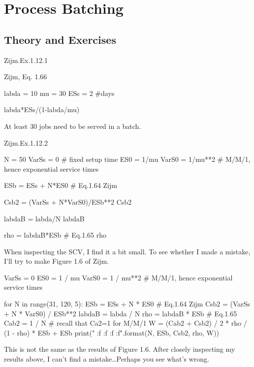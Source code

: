 \section{Process Batching}
\label{sec:process-batching}


\subsection*{Theory and Exercises}



\begin{exercise}
Zijm.Ex.1.12.1
 \begin{solution}
Zijm, Eq. 1.66

\begin{pyconsole}
labda = 10
mu = 30
ESs = 2 #days

labda*ESs/(1-labda/mu)
\end{pyconsole}

At least 30 jobs need to be served in a batch.
\end{solution}
\end{exercise}

\begin{exercise}
Zijm.Ex.1.12.2
 \begin{solution}

\begin{pyconsole}
  
N = 50
VarSs = 0 # fixed setup time
ES0 = 1/mu
VarS0 = 1/mu**2 # M/M/1, hence exponential service times

ESb = ESs + N*ES0 # Eq.1.64 Zijm

Csb2 = (VarSs + N*VarS0)/ESb**2 
Csb2

labdaB = labda/N
labdaB


rho = labdaB*ESb # Eq.1.65
rho 
\end{pyconsole}

When inspecting the SCV, I find it a bit small. To see whether I made a mistake, I'll try to make Figure 1.6 of Zijm.

\begin{pyconsole}
  
VarSs = 0
ES0 = 1 / mu
VarS0 = 1 / mu**2  # M/M/1, hence exponential service times

for N in range(31, 120, 5):
    ESb = ESs + N * ES0  # Eq.1.64 Zijm
    Csb2 = (VarSs + N * VarS0) / ESb**2
    labdaB = labda / N
    rho = labdaB * ESb  # Eq.1.65
    Cab2 = 1 / N  # recall that Ca2=1 for M/M/1
    W = (Cab2 + Csb2) / 2 * rho / (1 - rho) * ESb + ESb
    print("{} {:f} {:f} {:f} {:f}".format(N, ESb, Csb2, rho, W))

\end{pyconsole}

This is not the same as the results of Figure 1.6. After closely
inspecting my results above, I can't find a mistake\ldots Perhaps you see what's wrong.
\end{solution}
\end{exercise}

